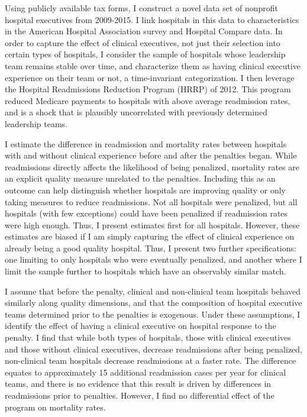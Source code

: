 \documentclass[12pt]{article}
\begin{document}
  Using publicly available tax forms, I construct a novel data set of nonprofit hospital executives from 2009-2015. I link hospitals in this data to characteristics in the American Hospital Association survey and Hospital Compare data. In order to capture the effect of clinical executives, not just their selection into certain types of hospitals, I consider the sample of hospitals whose leadership team remains stable over time, and characterize them as having clinical executive experience on their team or not, a time-invariant categorization. I then leverage the Hospital Readmissions Reduction Program (HRRP) of 2012. This program reduced Medicare payments to hospitals with above average readmission rates, and is a shock that is plausibly uncorrelated with previously determined leadership teams. 
  
  I estimate the difference in readmission and mortality rates between hospitals with and without clinical experience before and after the penalties began. While readmissions directly affects the likelihood of being penalized, mortality rates are an explicit quality measure unrelated to the penalties. Including this as an outcome can help distinguish whether hospitals are improving quality or only taking measures to reduce readmissions. Not all hospitals were penalized, but all hospitals (with few exceptions) could have been penalized if readmission rates were high enough. Thus, I present estimates first for all hospitals. However, these estimates are biased if I am simply capturing the effect of clinical experience on already being a good quality hospital. Thus, I present two further specifications: one limiting to only hospitals who were eventually penalized, and another where I limit the sample further to hospitals which have an observably similar match. 
  
  I assume that before the penalty, clinical and non-clinical team hospitals behaved similarly along quality dimensions, and that the composition of hospital executive teams determined prior to the penalties is exogenous. Under these assumptions, I identify the effect of having a clinical executive on hospital response to the penalty. I find that while both types of hospitals, those with clinical executives and those without clinical executives, decrease readmissions after being penalized, non-clinical team hospitals decrease readmissions at a faster rate. The difference equates to approximately 15 additional readmission cases per year for clinical teams, and there is no evidence that this result is driven by differences in readmissions prior to penalties. However, I find no differential effect of the program on mortality rates. 
\end{document}
